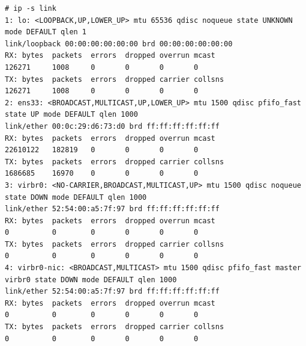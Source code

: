 \vspace{-15pt}
\begin{verbatim}
# ip -s link
1: lo: <LOOPBACK,UP,LOWER_UP> mtu 65536 qdisc noqueue state UNKNOWN mode DEFAULT qlen 1
link/loopback 00:00:00:00:00:00 brd 00:00:00:00:00:00
RX: bytes  packets  errors  dropped overrun mcast   
126271     1008     0       0       0       0       
TX: bytes  packets  errors  dropped carrier collsns 
126271     1008     0       0       0       0       
2: ens33: <BROADCAST,MULTICAST,UP,LOWER_UP> mtu 1500 qdisc pfifo_fast state UP mode DEFAULT qlen 1000
link/ether 00:0c:29:d6:73:d0 brd ff:ff:ff:ff:ff:ff
RX: bytes  packets  errors  dropped overrun mcast   
22610122   182819   0       0       0       0       
TX: bytes  packets  errors  dropped carrier collsns 
1686685    16970    0       0       0       0       
3: virbr0: <NO-CARRIER,BROADCAST,MULTICAST,UP> mtu 1500 qdisc noqueue state DOWN mode DEFAULT qlen 1000
link/ether 52:54:00:a5:7f:97 brd ff:ff:ff:ff:ff:ff
RX: bytes  packets  errors  dropped overrun mcast   
0          0        0       0       0       0       
TX: bytes  packets  errors  dropped carrier collsns 
0          0        0       0       0       0       
4: virbr0-nic: <BROADCAST,MULTICAST> mtu 1500 qdisc pfifo_fast master virbr0 state DOWN mode DEFAULT qlen 1000
link/ether 52:54:00:a5:7f:97 brd ff:ff:ff:ff:ff:ff
RX: bytes  packets  errors  dropped overrun mcast   
0          0        0       0       0       0       
TX: bytes  packets  errors  dropped carrier collsns 
0          0        0       0       0       0       
\end{verbatim}
\vspace{-10pt}